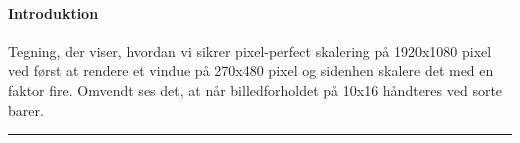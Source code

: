 \paragraph{Introduktion} Tegning, der viser, hvordan vi sikrer pixel-perfect skalering på 1920x1080 pixel ved først at rendere et vindue på 270x480 pixel og sidenhen skalere det med en faktor fire. Omvendt ses det, at når billedforholdet på 10x16 håndteres ved sorte barer.\\
\hrule

